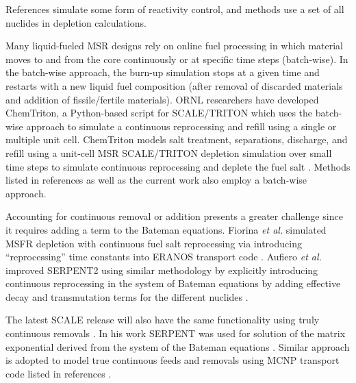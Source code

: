 References 
\cite{doligez_coupled_2014,heuer_towards_2014,sheu_depletion_2013,aufiero_extended_2013} 
simulate some form of reactivity control, and methods 
\cite{doligez_coupled_2014,heuer_towards_2014,aufiero_extended_2013,ahmad_neutronics_2015, 
park_whole_2015, 
jeong_equilibrium_2016,rykhlevskii_online_2017,nuttin_potential_2005} use a set 
of all nuclides in depletion calculations. 

Many liquid-fueled \gls{MSR} designs rely on online fuel processing in which  
material moves to and from the core continuously or at specific time steps 
(batch-wise). In the batch-wise approach, the burn-up simulation stops at a given 
time and restarts with a new liquid fuel composition (after removal of discarded 
materials and addition of fissile/fertile materials). \gls{ORNL} researchers 
have developed ChemTriton, a Python-based script for SCALE/TRITON which uses the 
batch-wise approach to simulate a continuous reprocessing and refill using a single 
or multiple unit cell. ChemTriton models salt 
treatment, separations, discharge, and refill using a unit-cell \gls{MSR} 
SCALE/TRITON depletion simulation over small time steps to simulate continuous 
reprocessing and deplete the fuel salt \cite{powers_new_2013}. Methods listed in 
references \cite{zhou_fuel_2018,sheu_depletion_2013,park_whole_2015, 
jeong_equilibrium_2016,powers_inventory_2014,betzler_molten_2017,rykhlevskii_online_2017} 
as well as the current work also employ a batch-wise approach.

Accounting for continuous removal or addition presents a greater challenge since it 
requires adding a term to the Bateman equations. Fiorina \emph{et al.} simulated 
\gls{MSFR} depletion with continuous fuel salt reprocessing via introducing 
``reprocessing'' time constants into ERANOS transport code \cite{fiorina_investigation_2013}. Aufiero \emph{et al.} improved SERPENT2 using similar methodology by explicitly introducing 
continuous reprocessing in the system of Bateman equations by adding effective decay and transmutation terms for the different nuclides \cite{aufiero_extended_2013}. 

The latest SCALE release will also have the same functionality using truly continuous removals \cite{betzler_implementation_2017}. In his work SERPENT was 
used for solution of the matrix exponential derived from the system of the Bateman 
equations \cite{aufiero_extended_2013}. Similar approach is adopted to model true 
continuous feeds and removals using MCNP transport code listed in references 
\cite{doligez_coupled_2014,heuer_towards_2014,nuttin_potential_2005}.

